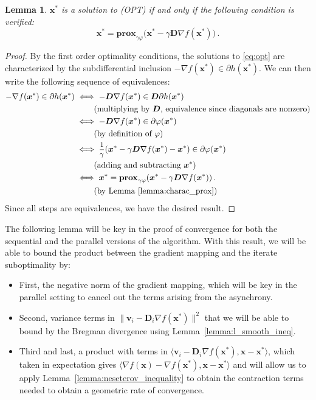 \documentclass{article}
\def\prox{{\mathbf{prox}}}
\def\xx{{\boldsymbol x}}
\def\vv{{\boldsymbol v}}
\def\DD{{\boldsymbol D}}
\newtheorem{lemma}{Lemma}
\begin{document}
\begin{lemma}\label{lemma:fixed_point}
  $\xx^*$ is a solution to (OPT) if and only if the following condition is verified:
\begin{equation}
 \xx^* = \prox_{\gamma \varphi}\big(\xx^* - \gamma \boldsymbol \DD \nabla f(\xx^*)\big)\,.
\end{equation}
\end{lemma}
\begin{proof}By the first order optimality conditions, the solutions to \eqref{eq:opt} are characterized by the subdifferential inclusion ${-\nabla f(\xx^*) \in \partial h(\xx^*)}$.
  We can then write the following sequence of equivalences:
\begin{align}
    - \nabla f(\xx^*) \in \partial h(\xx^*) &\iff - \DD \nabla f(\xx^*) \in \DD \partial h(\xx^*)\nonumber\\
    &\qquad \text{ (multiplying by $\DD$, equivalence since diagonals are nonzero)}\nonumber\\
    &\iff - \DD \nabla f(\xx^*) \in \partial \varphi(\xx^*)\nonumber\\
    &\qquad \text{ (by definition of $\varphi$)}\nonumber\\
    &\iff \mfrac{1}{\gamma}(\xx^* - \gamma \DD \nabla f(\xx^*) - \xx^*)  \in \partial \varphi(\xx^*) \nonumber\\
    &\qquad \text{ (adding and subtracting $\xx^*$)}\nonumber\\
    &\iff \xx^* = \prox_{\gamma \varphi}(\xx^* - \gamma \DD \nabla f(\xx^*))\,.\\
    &\qquad \text{ (by Lemma \ref{lemma:charac_prox})} \nonumber
\end{align}
  Since all steps are equivalences, we have the desired result.
\end{proof}

\hfill

The following lemma will be key in the proof of convergence for both the sequential and the parallel versions of the algorithm.
With this result, we will be able to bound the product between the gradient mapping and the iterate suboptimality by:
\begin{itemize}
\item First, the negative norm of the gradient mapping, which will be key in the parallel setting to cancel out the terms arising from the asynchrony.
\item  Second, variance terms in $\|\vv_i - \DD_i \nabla f(\xx^*)\|^2$ that we will be able to bound by the Bregman divergence using Lemma~\ref{lemma:l_smooth_ineq}.
\item Third and last, a product with terms in $\langle \vv_i - \DD_i\nabla f(\xx^*) , \xx - \xx^* \rangle$, which taken in expectation gives $\langle \nabla f(\xx) - \nabla f(\xx^*) , \xx - \xx^* \rangle$ and will allow us to apply Lemma~\ref{lemma:neseterov_inequality} to obtain the contraction terms needed to obtain a geometric rate of convergence.
\end{itemize}
\end{document}
